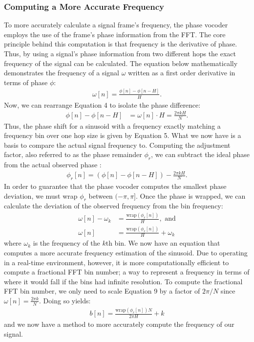 \documentclass[12pt]{article}
\begin{document}
\subsubsection{Computing a More Accurate Frequency}
To more accurately calculate a  signal frame's frequency, the phase vocoder employs the use of the frame's phase information from the FFT.
The core principle behind this computation is that frequency is the derivative of phase. Thus, by using a signal's phase information from two different hops
the exact frequency of the signal can be calculated. The equation below mathematically demonstrates the frequency of a signal $\omega$ written as a
first order derivative in terms of phase $\phi$: 
\begin{align}
  \omega[n] = \frac{\phi[n] - \phi[n-H]}{H}.
\end{align} 
Now, we can rearrange Equation 4 to isolate the phase difference:
\begin{align}
  \phi[n] - \phi[n-H] &= \omega[n] \cdot H = \frac{2\pi k H}{N}. 
\end{align}
Thus, the phase shift for a sinusoid with a frequency exactly matching a frequency bin over one hop size is given by Equation 5. 
What we now have is a basis to compare the actual signal frequency to. Computing the adjustment factor, also referred to as the phase
remainder $\phi_r$, we can subtract the ideal phase from the actual observed phase \cite{lim2007phasevocoder}: 
\begin{align}
  \phi_r[n] = (\phi[n] - \phi[n-H]) - \frac{2\pi k H}{N}.
\end{align}
In order to guarantee that the phase vocoder computes the smallest phase deviation, we must wrap $\phi_r$ between $(-\pi, \pi]$. Once the phase is wrapped, 
we can calculate the deviation of the observed frequency from the bin frequency: 
\begin{align}
  \omega[n] - \omega_k &= \frac{\text{wrap}(\phi_r[n])}{H}, \text{ and} \\
  \omega[n] &= \frac{\text{wrap}(\phi_r[n])}{H} + \omega_k 
\end{align}
where $\omega_k$ is the frequency of the $k$th bin. 
We now have an equation that computes a more accurate frequency estimation of the sinusoid. Due to operating in a real-time environment, however, 
it is more computationally efficient to compute a fractional FFT bin number; a way to represent a frequency in terms of where it would
fall if the bins had infinite resolution. To compute the fractional FFT bin number, we only need to scale Equation 9 by a factor of $2\pi/N$
since $\omega[n] = \frac{2\pi k}{N}$. Doing so yields: 
\begin{align}
  b[n] =  \frac{\text{wrap}(\phi_r[n])N}{2\pi H} + k
\end{align}
and we now have a method to more accurately compute the frequency of our signal.
\end{document}
